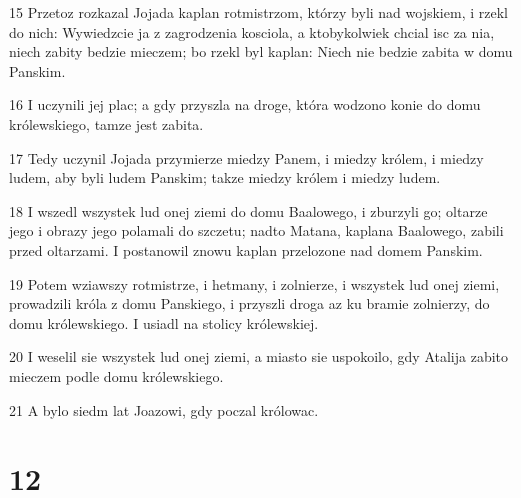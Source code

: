 \par 15 Przetoz rozkazal Jojada kaplan rotmistrzom, którzy byli nad wojskiem, i rzekl do nich: Wywiedzcie ja z zagrodzenia kosciola, a ktobykolwiek chcial isc za nia, niech zabity bedzie mieczem; bo rzekl byl kaplan: Niech nie bedzie zabita w domu Panskim.
\par 16 I uczynili jej plac; a gdy przyszla na droge, która wodzono konie do domu królewskiego, tamze jest zabita.
\par 17 Tedy uczynil Jojada przymierze miedzy Panem, i miedzy królem, i miedzy ludem, aby byli ludem Panskim; takze miedzy królem i miedzy ludem.
\par 18 I wszedl wszystek lud onej ziemi do domu Baalowego, i zburzyli go; oltarze jego i obrazy jego polamali do szczetu; nadto Matana, kaplana Baalowego, zabili przed oltarzami. I postanowil znowu kaplan przelozone nad domem Panskim.
\par 19 Potem wziawszy rotmistrze, i hetmany, i zolnierze, i wszystek lud onej ziemi, prowadzili króla z domu Panskiego, i przyszli droga az ku bramie zolnierzy, do domu królewskiego. I usiadl na stolicy królewskiej.
\par 20 I weselil sie wszystek lud onej ziemi, a miasto sie uspokoilo, gdy Atalija zabito mieczem podle domu królewskiego.
\par 21 A bylo siedm lat Joazowi, gdy poczal królowac.

\chapter{12}

